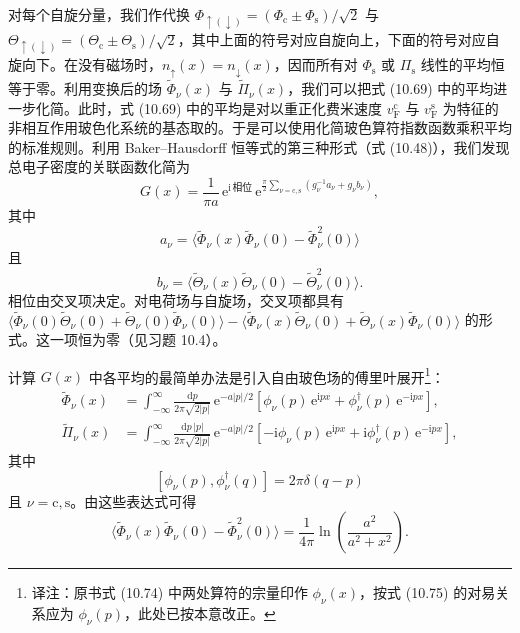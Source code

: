 对每个自旋分量，我们作代换 $\Phi_{\uparrow(\downarrow)}=(\Phi_{\mathrm{c}}\pm\Phi_{\mathrm{s}})/\sqrt{2}$ 与 $\Theta_{\uparrow(\downarrow)}=(\Theta_{\mathrm{c}}\pm\Theta_{\mathrm{s}})/\sqrt{2}$，其中上面的符号对应自旋向上，下面的符号对应自旋向下。在没有磁场时，$n_{\uparrow}(x)=n_{\downarrow}(x)$，因而所有对 $\Phi_{\mathrm{s}}$ 或 $\Pi_{\mathrm{s}}$ 线性的平均恒等于零。利用变换后的场 $\tilde{\Phi}_{\nu}(x)$ 与 $\tilde{\Pi}_{\nu}(x)$，我们可以把式 (10.69) 中的平均进一步化简。此时，式 (10.69) 中的平均是对以重正化费米速度 $v_{\mathrm{F}}^{\mathrm{c}}$ 与 $v_{\mathrm{F}}^{\mathrm{s}}$ 为特征的非相互作用玻色化系统的基态取的。于是可以使用化简玻色算符指数函数乘积平均的标准规则。利用 Baker–Hausdorff 恒等式的第三种形式（式 (10.48)），我们发现总电子密度的关联函数化简为
\begin{equation*}
G(x)=\frac{1}{\pi a}\,\mathrm{e}^{\mathrm{i}\,\text{相位}}\,\mathrm{e}^{\frac{\pi}{2}\sum_{\nu=\mathrm{c},\mathrm{s}}\left(g_{\nu}^{-1}a_{\nu}+g_{\nu}b_{\nu}\right)},
\tag{10.71}
\end{equation*}
其中
\begin{equation*}
a_{\nu}=\langle\tilde{\Phi}_{\nu}(x)\tilde{\Phi}_{\nu}(0)-\tilde{\Phi}_{\nu}^{2}(0)\rangle
\tag{10.72}
\end{equation*}
且
\begin{equation*}
b_{\nu}=\langle\tilde{\Theta}_{\nu}(x)\tilde{\Theta}_{\nu}(0)-\tilde{\Theta}_{\nu}^{2}(0)\rangle.
\tag{10.73}
\end{equation*}
相位由交叉项决定。对电荷场与自旋场，交叉项都具有 $\langle\tilde{\Phi}_{\nu}(0)\tilde{\Theta}_{\nu}(0)+\tilde{\Theta}_{\nu}(0)\tilde{\Phi}_{\nu}(0)\rangle-\langle\tilde{\Phi}_{\nu}(x)\tilde{\Theta}_{\nu}(0)+\tilde{\Theta}_{\nu}(x)\tilde{\Phi}_{\nu}(0)\rangle$ 的形式。这一项恒为零（见习题 10.4）。

计算 $G(x)$ 中各平均的最简单办法是引入自由玻色场的傅里叶展开\footnote{译注：原书式 (10.74) 中两处算符的宗量印作 $\phi_{\nu}(x)$，按式 (10.75) 的对易关系应为 $\phi_{\nu}(p)$，此处已按本意改正。}：
\begin{align*}
\tilde{\Phi}_{\nu}(x)&=\int_{-\infty}^{\infty}\frac{\mathrm{d}p}{2\pi\sqrt{2|p|}}\,\mathrm{e}^{-a|p|/2}\left[\phi_{\nu}(p)\,\mathrm{e}^{\mathrm{i}px}+\phi_{\nu}^{\dagger}(p)\,\mathrm{e}^{-\mathrm{i}px}\right],\\
\tilde{\Pi}_{\nu}(x)&=\int_{-\infty}^{\infty}\frac{\mathrm{d}p\,|p|}{2\pi\sqrt{2|p|}}\,\mathrm{e}^{-a|p|/2}\left[-\mathrm{i}\phi_{\nu}(p)\,\mathrm{e}^{\mathrm{i}px}+\mathrm{i}\phi_{\nu}^{\dagger}(p)\,\mathrm{e}^{-\mathrm{i}px}\right],
\tag{10.74}
\end{align*}
其中
\begin{equation*}
\left[\phi_{\nu}(p),\phi_{\nu}^{\dagger}(q)\right]=2\pi\delta(q-p)
\tag{10.75}
\end{equation*}
且 $\nu=\mathrm{c},\mathrm{s}$。由这些表达式可得
\begin{equation*}
\langle\tilde{\Phi}_{\nu}(x)\tilde{\Phi}_{\nu}(0)-\tilde{\Phi}_{\nu}^{2}(0)\rangle=\frac{1}{4\pi}\ln\left(\frac{a^{2}}{a^{2}+x^{2}}\right).
\tag{10.76}
\end{equation*}

